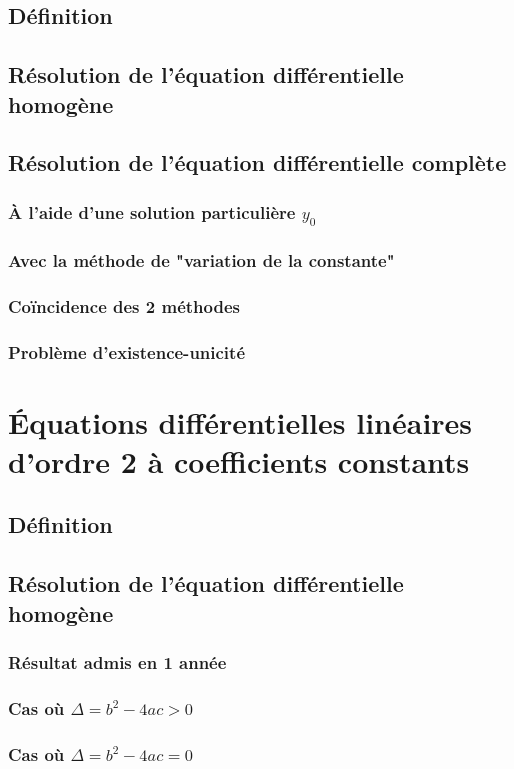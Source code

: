 \documentclass[12pt,a4paper,french]{book}
\begin{document}
		\subsection{Définition}
		\subsection{Résolution de l'équation différentielle homogène}
		\subsection{Résolution de l'équation différentielle complète}
			\subsubsection{À l'aide d'une solution particulière $y_0$}
			\subsubsection{Avec la méthode de "variation de la constante"}
			\subsubsection{Coïncidence des 2 méthodes}
			\subsubsection{Problème d'existence-unicité}
	\section{Équations différentielles linéaires d'ordre 2 à coefficients constants}
		\subsection{Définition}
		\subsection{Résolution de l'équation différentielle homogène}
			\subsubsection{Résultat admis en 1 année}
			\subsubsection{Cas où $\Delta = b^{2}-4ac > 0$}
			\subsubsection{Cas où $\Delta = b^{2}-4ac = 0$}
\end{document}
